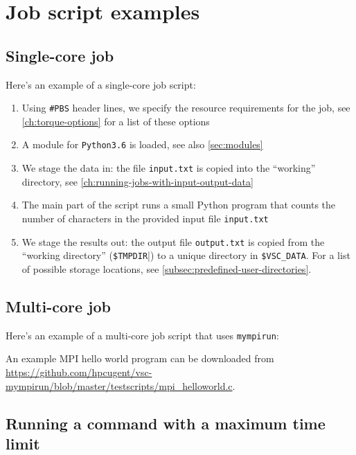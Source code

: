 \chapter{Job script examples}
\label{ch:jobscript-examples}

\section{Single-core job}

Here's an example of a single-core job script:


\begin{enumerate}
    \item Using \lstinline|#PBS| header lines, we specify the resource requirements for the job,
        see \autoref{ch:torque-options} for a list of these options
    \item A module for \lstinline|Python3.6| is loaded, see also \autoref{sec:modules}
    \item We stage the data in: the file \lstinline|input.txt| is copied into the ``working'' directory, see \autoref{ch:running-jobs-with-input-output-data}
    \item The main part of the script runs a small Python program that counts the
        number of characters in the provided input file \lstinline|input.txt|
    \item We stage the results out: the output file \lstinline|output.txt| is copied from
        the ``working directory'' (\lstinline|$TMPDIR||) to a unique directory in \lstinline|$VSC_DATA|.
        For a list of possible storage locations, see \autoref{subsec:predefined-user-directories}.
\end{enumerate}

\section{Multi-core job}

Here's an example of a multi-core job script that uses \lstinline|mympirun|:


An example MPI hello world program can be downloaded from \url{https://github.com/hpcugent/vsc-mympirun/blob/master/testscripts/mpi_helloworld.c}.


\section{Running a command with a maximum time limit}
\label{sec:maximum-timelimit-timeout-jobscript}

